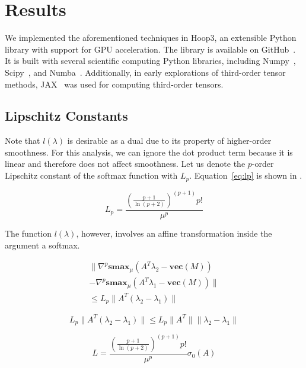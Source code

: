 \documentclass[journal]{IEEEtran}
\begin{document}
\section{Results}
\label{sec:results}

We implemented the aforementioned techniques in Hoop3, an extensible Python library with support for GPU acceleration. The library is available on GitHub~\cite{BowmanHoop}. It is built with several scientific computing Python libraries, including Numpy~\cite{numpy}, Scipy~\cite{scipy}, and Numba~\cite{numba}. Additionally, in early explorations of third-order tensor methods, JAX~\cite{jax2018github} was used for computing third-order tensors. 

\subsection{Lipschitz Constants}

Note that $l(\lambda)$ is desirable as a dual due to its property of higher-order smoothness. For this analysis, we can ignore the dot product term because it is linear and therefore does not affect smoothness. Let us denote the $p$-order Lipschitz constant of the softmax function with $L_p$. Equation~\ref{eq:lp} is shown in \cite{pmlr-v125-bullins20a}.

\begin{equation}
    L_p = \frac{(\frac{p+1}{\ln(p+2)})^{(p+1)} p!}{\mu^p}
    \label{eq:lp}
\end{equation}

The function $l(\lambda)$, however, involves an affine transformation inside the argument a softmax.

\begin{equation}
\begin{split}
\|\nabla^p \mathbf{smax}_\mu(A^T\lambda_2- \mathbf{vec}(M)) \\ - \nabla^p \mathbf{smax}_\mu(A^T\lambda_1 - \mathbf{vec}(M)) \|\\
 \le L_p \|A^T(\lambda_2 - \lambda_1) \|
\end{split}
\label{eq:full_l}
\end{equation}

\begin{equation}
    L_p \|A^T(\lambda_2 - \lambda_1) \| \le L_p \|A^T\|\|\lambda_2 - \lambda_1\|
\end{equation}

\begin{equation}
    L = \frac{(\frac{p+1}{\ln(p+2)})^{(p+1)} p!}{\mu^p} \sigma_{0}(A)
\end{equation}
\end{document}
